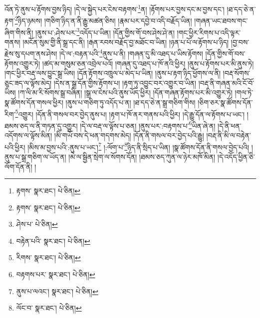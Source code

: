 འོན་ཏེ་ནུས་པ་རྟོགས་བྱས་ཉིད། །དེ་ལ་སྐྱེད་པར་ངེས་བརྟགས་\footnote{རྟགས་  སྣར་ཐང་།  པེ་ཅིན། }ན། །རྟོགས་པར་བྱས་དང་མ་བྱས་དང་། །ཐ་དད་ཅེ་ན་རྟག་\footnote{རྟགས་  སྣར་ཐང་།  པེ་ཅིན། }ཉིད་ཉམས། །གཅིག་ཉིད་ན་ནི་རྒྱུ་མཚན་ཅིས། །རྣམ་པར་དབྱེ་བ་འདི་བརྗོད་ཡིན། །གཞན་ཡང་ཐབས་གང་ཞིག་གིས་ནི། །ནུས་པ་:ཤེས་པར་\footnote{ཤེས་པ་  པེ་ཅིན། }འདོད་པ་ཡིན། །དོན་གྱིས་གོ་བས་ཤེས་ཤེ་ན། །གང་ཕྱིར་རིགས་པ་འདི་ལྟར་གནས། །མངོན་སུམ་གྱི་ནི་སྒྲ་དང་ནི། །རྒན་རབས་བརྗོད་བྱ་མཐོང་བ་ཡིན། །ཉན་པ་པོ་ལ་རྟོགས་པ་ཉིད། །བྱ་བས་རྗེས་སུ་དཔག་ནས་ཤེས། །དེ་ལ་:བརྟན་པའི་\footnote{བརྟེན་པའི་  སྣར་ཐང་།  པེ་ཅིན། }ནུས་པ་ནི། །གཞན་དུ་མི་འཐད་པ་ཡིས་རྟོགས། །དོན་གྱིས་གོ་བས་རྟོགས་འགྱུར་ཏེ། །ཚད་མ་གསུམ་ཅན་འབྲེལ་པའོ། །གཞན་དུ་འཐད་པ་ཁོ་ནའི་ཕྱིར། །ནུས་པ་རྟོགས་པར་མི་ནུས་ཏེ། །གང་ཕྱིར་བརྡ་ལས་བྱུང་སྒྲ་ཡིས། །དོན་རྟོགས་འཁྲུལ་པ་མེད་པ་ཡིན། །ནུས་པ་རྟག་ཉིད་ཕྱོགས་ལ་ནི། །བརྡ་སོགས་ཅུང་ཟད་ལ་ལྟོས་མེད། །དེས་ན་སྒྲ་དོན་གྱིས་རྟོགས་པ། །རྟག་ཏུ་འབྱུང་བར་འགྱུར་བ་ཡིན། །བརྡ་ནི་གཞན་མའི་ངོ་བོ་ཡིས། །ཀ་ལི་མ་རི་སོགས་སྒྲ་བཞིན། །སྒྲ་ལ་ངེས་པའི་ནུས་ཡོད་ཕྱིར། །དོན་གཞན་རྟོགས་པར་མི་འགྱུར་ཏེ། །གལ་ཏེ་སྣ་ཚོགས་དོན་གསལ་ཕྱིར། །ནུས་པ་གཅིག་ཏུ་འདོད་པ་ན། །ཐ་དད་ཅེ་ན་སྒྲ་གཅིག་གིས། །ཅིག་ཅར་སྣ་ཚོགས་དོན་རིག་\footnote{རིགས་  སྣར་ཐང་།  པེ་ཅིན། }འགྱུར། །དོན་ནི་གསལ་བར་བྱེད་ནུས་པ། །རྟག་པ་ཁོ་ནར་གནས་པའི་ཕྱིར། །དེ་རྒྱུ་དོན་ལ་རྟོགས་པ་ཡང་། །ཐམས་ཅད་ལ་ནི་གཏན་དུ་འགྱུར། །དེ་ལ་བརྡ་ལ་ལྟོས་པ་ཅན། །ནུས་པར་:བརྟགས་པ་\footnote{བརྟགས་པར་  སྣར་ཐང་།  པེ་ཅིན། }ཡིན་ཞེ་ན། །དེ་ནི་ཕན་འདོགས་ལ་ལྟོས་མིན། །མི་གཡོ་བས་དེ་ཕན་གདགས་མེད། །དོན་ནི་གསལ་བར་བྱེད་པའི་རྒྱུ། །བརྡ་ནི་མི་ལ་བརྟེན་པའི་ཕྱིར། །མིས་མ་བྱས་པའི་:ནུས་པ་ཡང་།\footnote{ནུས་པ་ལའང་།  སྣར་ཐང་།  པེ་ཅིན། } །:ལོག་པ་\footnote{ལོང་བ་  སྣར་ཐང་།  པེ་ཅིན། }ཉིད་ནི་སྲིད་པ་ཡིན། །སྣ་ཚོགས་དོན་ནི་གསལ་བྱེད་པའི། །ནུས་པ་སྒྲ་གཅིག་ལ་ཡོད་ན། །མེ་ལ་སྦྱིན་སྲེག་ལ་སོགས་དོན། །ཐམས་ཅད་ཀུན་ལ་ཉེར་མཁོ་མིན། །དེ་འདོད་ཕྱིན་ཅི་ལོག་དོན་ནི། །
